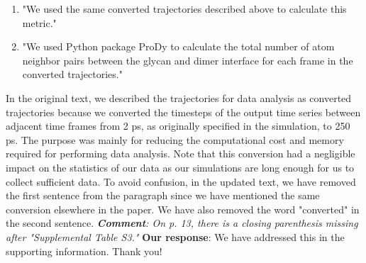 \documentclass[sn-vancouver]{sn-jnl}
\begin{document}
\begin{enumerate}
\item "We used the same converted trajectories described above to calculate this metric."
\item "We used Python package ProDy to calculate the total number of atom neighbor pairs between the glycan and dimer interface for each frame in the converted trajectories."
\end{enumerate}
In the original text, we described the trajectories for data analysis as converted trajectories because we converted the timesteps of the output time series between adjacent time frames from 2 ps, as originally specified in the simulation, to 250 ps. The purpose was mainly for reducing the computational cost and memory required for performing data analysis. Note that this conversion had a negligible impact on the statistics of our data as our simulations are long enough for us to collect sufficient data.
\newline
\indent
To avoid confusion, in the updated text, we have removed the first sentence from the paragraph since we have mentioned the same conversion elsewhere in the paper. We have also removed the word "converted" in the second sentence.
\newline
\newline
\indent
\textit{\textbf{Comment}:
On p. 13, there is a closing parenthesis missing after "Supplemental Table S3."}
\newline
\indent 
{\bf Our response}: We have addressed this in the supporting information. Thank you!
\end{document}
